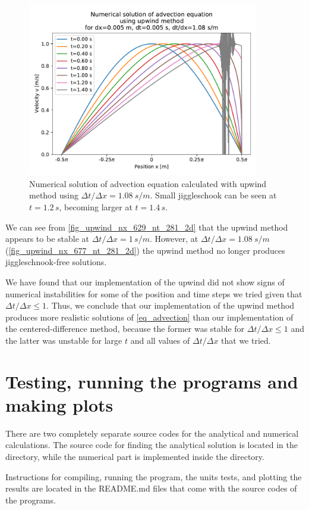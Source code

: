 \begin{figure}[H]
  \centering
  \includegraphics[width=0.9\textwidth]{figures/numerical/upwind_nx_677_nt_281_2d.pdf}
  \vspace*{-5mm}
  \caption{Numerical solution of advection equation calculated with upwind method using $\Delta t / \Delta x = 1.08 \ s/m$. Small jiggleschook can be seen at $t=1.2 \, s$, becoming larger at $t=1.4 \, s$.}
  \label{fig_upwind_nx_677_nt_281_2d}
\end{figure}

We can see from \autoref{fig_upwind_nx_629_nt_281_2d} that the upwind method appears to be stable at $\Delta t / \Delta x = 1 \, s/m$. However, at $\Delta t / \Delta x = 1.08 \ s/m$ (\autoref{fig_upwind_nx_677_nt_281_2d}) the upwind method no longer produces jiggleschnook-free solutions.

We have found that our implementation of the upwind did not show signs of numerical instabilities for some of the position and time steps we tried given that $\Delta t / \Delta x \leq 1$. Thus, we conclude that our implementation of the upwind method produces more realistic solutions of \autoref{eq_advection} than our implementation of the centered-difference method, because the former was stable for $\Delta t / \Delta x \leq 1$ and the latter was unstable for large $t$ and all values of $\Delta t / \Delta x$ that we tried.


\section{Testing, running the programs and making plots}

There are two completely separate source codes for the analytical and numerical calculations. The source code for finding the analytical solution is located in the  directory, while the numerical part is implemented inside the  directory.

Instructions for compiling, running the program, the units tests, and plotting the results are located in the README.md files that come with the source codes of the programs.